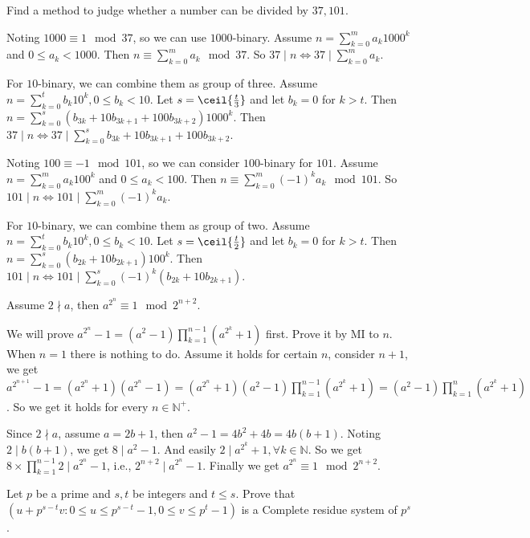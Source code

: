 \documentclass{ctexart}
\begin{document}
\begin{problem}\label{pro:p38.3}
  Find a method to judge whether a number can be divided by \(37,101\).
\end{problem}
\begin{solution}
  Noting \(1000 \equiv 1 \mod 37\), so we can use \(1000\)-binary.
  Assume \(n=\sum_{k=0}^{m}a_k 1000^k\) and \(0 \leq a_k<1000\).
  Then \(n \equiv \sum_{k=0}^{m}a_k \mod 37\). So \(37 \mid n \iff 37 \mid \sum_{k=0}^{m}a_k\).

  For \(10\)-binary, we can combine them as group of three.
  Assume \(n=\sum_{k=0}^{t}b_k 10^k,0 \leq b_k <10\). Let \(s=\ceil{\frac{t}{3}}\) and let \(b_k=0\) for \(k>t\).
  Then \(n=\sum_{k=0}^{s}(b_{3k}+10b_{3k+1}+100b_{3k+2}) 1000^k\).
  Then \(37 \mid n \iff 37 \mid \sum_{k=0}^{s}b_{3k}+10b_{3k+1}+100b_{3k+2}\).

  Noting \(100 \equiv -1 \mod 101\), so we can consider \(100\)-binary for \(101\).
  Assume \(n=\sum_{k=0}^{m}a_k 100^k\) and \(0 \leq a_k<100\).
  Then \(n \equiv \sum_{k=0}^{m}(-1)^ka_k \mod 101\). So \(101 \mid n \iff 101 \mid \sum_{k=0}^{m}(-1)^ka_k\).

  For \(10\)-binary, we can combine them as group of two.
  Assume \(n=\sum_{k=0}^{t}b_k 10^k,0 \leq b_k <10\). Let \(s=\ceil{\frac{t}{2}}\) and let \(b_k=0\) for \(k>t\).
  Then \(n=\sum_{k=0}^{s}(b_{2k}+10b_{2k+1}) 100^k\).
  Then \(101 \mid n \iff 101 \mid \sum_{k=0}^{s}(-1)^k(b_{2k}+10b_{2k+1})\).
\end{solution}
\begin{problem}\label{pro:p38.5}
  Assume \(2 \nmid a\), then \(a^{2^n} \equiv 1 \mod 2^{n + 2}\).
\end{problem}
\begin{solution}
  We will prove \(a^{2^n}-1=(a^2-1)\prod_{k=1}^{n-1}(a^{2^k}+1)\) first.
  Prove it by MI to \(n\). When \(n=1\) there is nothing to do.
  Assume it holds for certain \(n\), consider \(n+1\), we get
  \(a^{2^{n + 1}}-1=(a^{2^n}+1)(a^{2^n}-1)=(a^{2^n}+1)(a^2-1)\prod_{k=1}^{n-1}(a^{2^k}+1)=(a^2-1)\prod_{k=1}^{n}(a^{2^k}+1)\).
  So we get it holds for every \(n \in \mathbb{N}^+\).

  Since \(2 \nmid a\), assume \(a=2b+1\), then \(a^2-1=4b^2+4b=4b(b+1)\). Noting \(2 \mid b(b+1)\), we get \(8 \mid a^2-1\).
  And easily \(2 \mid a^{2^k}+1,\forall k \in \mathbb{N}\).
  So we get \(8 \times \prod_{k=1}^{n-1}2 \mid a^{2^n}-1\), i.e., \(2^{n+2}\mid a^{2^n}-1\).
  Finally we get \(a^{2^n}\equiv 1 \mod 2^{n+2}\).
\end{solution}
\begin{problem}\label{pro:p40.1}
  Let \(p\) be a prime and \(s,t\) be integers and \(t \leq s\).
  Prove that \((u+p^{s-t}v:0 \leq u \leq p^{s-t}-1,0 \leq v \leq p^t-1)\) is a Complete residue system of \(p^s\).
\end{problem}
\end{document}
